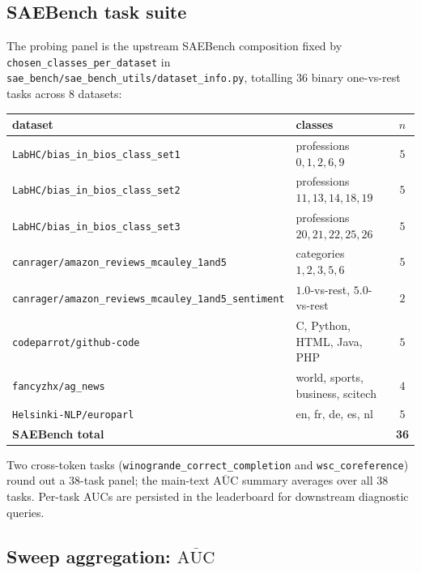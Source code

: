 \subsection{SAEBench task suite}
\label{app:c3-tasks}

The probing panel is the upstream SAEBench composition fixed by \texttt{chosen\_classes\_per\_dataset} in \texttt{sae\_bench/sae\_bench\_utils/dataset\_info.py}, totalling $36$ binary one-vs-rest tasks across $8$ datasets:

\begin{table}[h]
    \centering
    \footnotesize
    \begin{tabular}{l l c}
        \toprule
        dataset & classes & $n$ \\
        \midrule
        \texttt{LabHC/bias\_in\_bios\_class\_set1} & professions $0, 1, 2, 6, 9$ & $5$ \\
        \texttt{LabHC/bias\_in\_bios\_class\_set2} & professions $11, 13, 14, 18, 19$ & $5$ \\
        \texttt{LabHC/bias\_in\_bios\_class\_set3} & professions $20, 21, 22, 25, 26$ & $5$ \\
        \texttt{canrager/amazon\_reviews\_mcauley\_1and5} & categories $1, 2, 3, 5, 6$ & $5$ \\
        \texttt{canrager/amazon\_reviews\_mcauley\_1and5\_sentiment} & $1.0$-vs-rest, $5.0$-vs-rest & $2$ \\
        \texttt{codeparrot/github-code} & C, Python, HTML, Java, PHP & $5$ \\
        \texttt{fancyzhx/ag\_news} & world, sports, business, scitech & $4$ \\
        \texttt{Helsinki-NLP/europarl} & en, fr, de, es, nl & $5$ \\
        \midrule
        \textbf{SAEBench total} & & \textbf{36} \\
        \bottomrule
    \end{tabular}
\end{table}

Two cross-token tasks (\texttt{winogrande\_correct\_completion} and \texttt{wsc\_coreference}) round out a $38$-task panel; the main-text $\overline{\mathrm{AUC}}$ summary averages over all $38$ tasks. Per-task AUCs are persisted in the leaderboard for downstream diagnostic queries.

\subsection{Sweep aggregation: $\overline{\mathrm{AUC}}$}
\label{app:c3-summary-metric}

